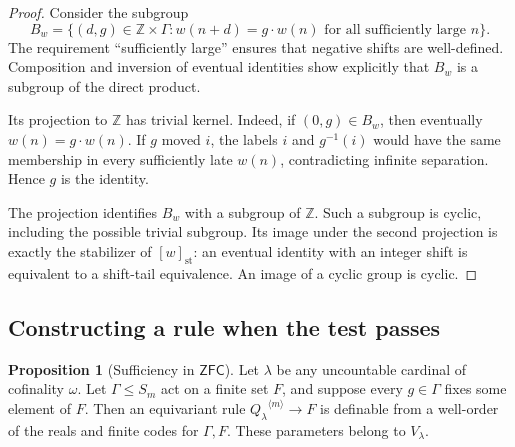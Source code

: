 \documentclass[11pt,letterpaper]{article}
\theoremstyle{definition}
\newtheorem{proposition}[definition]{Proposition}
\numberwithin{equation}{section}
\newcommand{\ZFC}{\mathsf{ZFC}}
\newcommand{\ttuple}[2]{{#1}^{\langle #2\rangle}}
\begin{document}
\begin{proof}
Consider the subgroup
\[
 B_w=\{(d,g)\in\mathbb Z\times\Gamma:
             w(n+d)=g\cdot w(n)\text{ for all sufficiently large }n\}.
\]
The requirement ``sufficiently large'' ensures that negative shifts are
well-defined. Composition and inversion of eventual identities show
explicitly that $B_w$ is a subgroup of the direct product.

Its projection to $\mathbb Z$ has trivial kernel. Indeed, if $(0,g)\in B_w$,
then eventually $w(n)=g\cdot w(n)$. If $g$ moved $i$, the labels $i$ and
$g^{-1}(i)$ would have the same membership in every sufficiently late
$w(n)$, contradicting infinite separation. Hence $g$ is the identity.

The projection identifies $B_w$ with a subgroup of $\mathbb Z$. Such a
subgroup is cyclic, including the possible trivial subgroup. Its image
under the second projection is exactly the stabilizer of
$[w]_{\mathrm{st}}$: an eventual identity with an integer shift is equivalent
to a shift-tail equivalence. An image of a cyclic group is cyclic.
\end{proof}

\subsection{Constructing a rule when the test passes}

\begin{proposition}[Sufficiency in $\ZFC$]\label{prop:sufficiency}
Let $\lambda$ be any uncountable cardinal of cofinality $\omega$. Let
$\Gamma\le S_m$ act on a finite set $F$, and suppose every $g\in\Gamma$
fixes some element of $F$. Then an equivariant rule
$\ttuple{Q_\lambda}{m}\to F$ is definable from a well-order of the reals and
finite codes for $\Gamma,F$. These parameters belong to $V_\lambda$.
\end{proposition}
\end{document}
